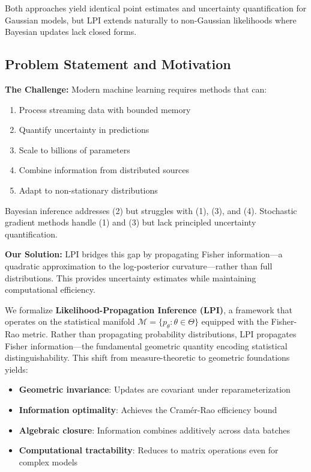 \documentclass[11pt]{article}
\begin{document}
Both approaches yield identical point estimates and uncertainty quantification for Gaussian models, but LPI extends naturally to non-Gaussian likelihoods where Bayesian updates lack closed forms.

\subsection{Problem Statement and Motivation}

\textbf{The Challenge:} Modern machine learning requires methods that can:
\begin{enumerate}
\item Process streaming data with bounded memory
\item Quantify uncertainty in predictions
\item Scale to billions of parameters
\item Combine information from distributed sources
\item Adapt to non-stationary distributions
\end{enumerate}

Bayesian inference addresses (2) but struggles with (1), (3), and (4). Stochastic gradient methods handle (1) and (3) but lack principled uncertainty quantification.

\textbf{Our Solution:} LPI bridges this gap by propagating Fisher information—a quadratic approximation to the log-posterior curvature—rather than full distributions. This provides uncertainty estimates while maintaining computational efficiency.

We formalize \textbf{Likelihood-Propagation Inference (LPI)}, a framework that operates on the statistical manifold $\mathcal{M} = \{p_\theta : \theta \in \Theta\}$ equipped with the Fisher-Rao metric. Rather than propagating probability distributions, LPI propagates Fisher information—the fundamental geometric quantity encoding statistical distinguishability. This shift from measure-theoretic to geometric foundations yields:

\begin{itemize}
\item \textbf{Geometric invariance}: Updates are covariant under reparameterization
\item \textbf{Information optimality}: Achieves the Cramér-Rao efficiency bound
\item \textbf{Algebraic closure}: Information combines additively across data batches
\item \textbf{Computational tractability}: Reduces to matrix operations even for complex models
\end{itemize}
\end{document}
